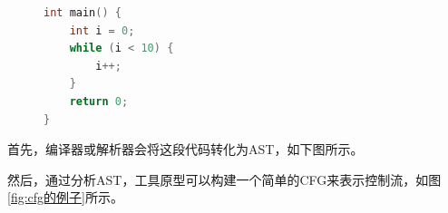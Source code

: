 \begin{figure}[htbp]
    \centering
\begin{minipage}{4cm}
\begin{lstlisting}[language=c++]
int main() {
    int i = 0;
    while (i < 10) {
        i++;
    }
    return 0;
}
\end{lstlisting}
\end{minipage}
\end{figure}

首先，编译器或解析器会将这段代码转化为AST，如下图所示。

然后，通过分析AST，工具原型可以构建一个简单的CFG来表示控制流，如图\ref{fig:cfg的例子}所示。





